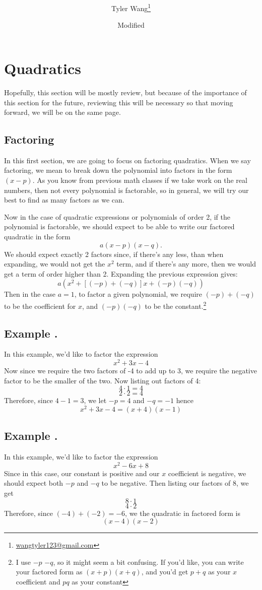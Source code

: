 \documentclass[11pt]{article}
\title{\mytitle \\ [2ex] \Large \mysubtitle}
\date{\small Modified \mydate}
\author {Tyler Wang\thanks{
\href{mailto:wangtyler123@gmail.com}{wangtyler123@gmail.com}}}
\numberwithin{lemma}{section}
\numberwithin{equation}{section}
\numberwithin{define}{section}
\numberwithin{prop}{section}
\numberwithin{figure}{section}
\numberwithin{theorem}{section}
\numberwithin{cor}{section}
\newcounter{ex}[section]
\newenvironment{ex}[0]{

	\refstepcounter{ex}
    \subsection*{Example \theex .}
    }
    {
    \par
    }
\numberwithin{ex}{section}
\begin{document}
\maketitle
\section{Quadratics}
Hopefully, this section will be mostly review, but because of the importance of this section for the future, reviewing this will be necessary so that moving forward, we will be on the same page. 
\subsection{Factoring}
In this first section, we are going to focus on factoring quadratics.
When we say factoring, we mean to break down the polynomial into factors in the form $(x-p)$.
As you know from previous math classes if we take work on the real numbers, then not every polynomial is factorable, so in general, we will try our best to find as many factors as we can.

Now in the case of quadratic expressions or polynomials of order 2, if the polynomial is factorable, we should expect to be able to write our factored quadratic in the form
$$a(x-p)(x-q).$$
We should expect exactly 2 factors since, if there's any less, than when expanding, we would not get the $x^2$ term, and if there's any more, then we would get a term of order higher than 2. 
Expanding the previous expression gives:
$$a(x^2+[(-p)+(-q)]x+(-p)(-q))$$
Then in the case $a=1$, to factor a given polynomial, we require $(-p)+(-q)$ to be the coefficient for $x$, and $(-p)(-q)$ to be the constant.\footnote{
I use $-p$ $-q$, so it might seem a bit confusing. If you'd like, you can write your factored form as $(x+p)(x+q)$, and you'd get $p+q$ as your $x$ coefficient and $pq$ as your constant}

\begin{ex}
In this example, we'd like to factor the expression
$$x^2+3x-4$$
Now since we require the two factors of -4 to add up to 3, we require the negative factor to be the smaller of the two. Now listing out factors of 4:
$$4\cdot 1 =4$$
$$2\cdot 2=4$$
Therefore, since $4-1=3$, we let $-p=4$ and $-q=-1$ hence
$$x^2+3x-4=(x+4)(x-1)$$
\end{ex}
\begin{ex}
In this example, we'd like to factor the expression
$$x^2-6x+8$$
Since in this case, our constant is positive and our $x$ coefficient is negative, we should expect both $-p$ and $-q$ to be negative. Then listing our factors of $8$, we get
$$8\cdot 1$$
$$4\cdot 2$$
Therefore, since $(-4)+(-2)=-6$, we the quadratic in factored form is
$$(x-4)(x-2)$$
\end{ex}
\end{document}
